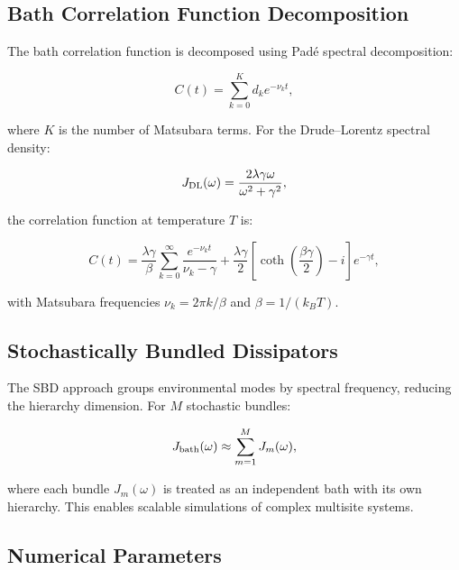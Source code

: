 \documentclass[11pt,a4paper]{article}
\begin{document}
\subsection{Bath Correlation Function Decomposition}

The bath correlation function is decomposed using Padé spectral decomposition:

\begin{equation}
C(t) = \sum_{k=0}^{K} d_k e^{-\nu_k t},
\label{eq:SI_bath_correlation}
\end{equation}

where $K$ is the number of Matsubara terms. For the Drude--Lorentz spectral density:

\begin{equation}
J_{\rm DL}(\omega) = \frac{2\lambda\gamma\omega}{\omega^2 + \gamma^2},
\label{eq:SI_drude_lorentz}
\end{equation}

the correlation function at temperature $T$ is:

\begin{equation}
C(t) = \frac{\lambda\gamma}{\beta}\sum_{k=0}^{\infty} \frac{e^{-\nu_k t}}{\nu_k - \gamma} + \frac{\lambda\gamma}{2}\left[\coth\left(\frac{\beta\gamma}{2}\right) - i\right]e^{-\gamma t},
\label{eq:SI_correlation_DL}
\end{equation}

with Matsubara frequencies $\nu_k = 2\pi k/\beta$ and $\beta = 1/(k_B T)$.

\subsection{Stochastically Bundled Dissipators}

The SBD approach groups environmental modes by spectral frequency, reducing the hierarchy dimension. For $M$ stochastic bundles:

\begin{equation}
J_{\rm bath}(\omega) \approx \sum_{m=1}^{M} J_m(\omega),
\label{eq:SI_sbd}
\end{equation}

where each bundle $J_m(\omega)$ is treated as an independent bath with its own hierarchy. This enables scalable simulations of complex multisite systems.

\subsection{Numerical Parameters}
\end{document}
